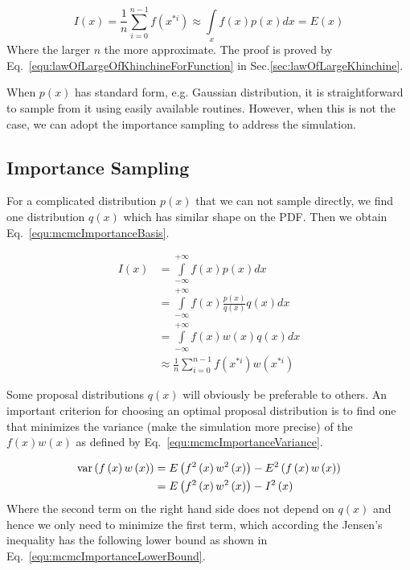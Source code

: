 \documentclass[runningheads,openany]{xhlPaper}
\begin{document}
\begin{equation}
\label{equ:mcmcPrincipleMC}
I\left( x \right) = \frac{1}{n}\sum\limits_{i = 0}^{n - 1} {f\left( {{x^{*i}}} \right)}  \approx \int\limits_x {f\left( x \right)p\left( x \right)dx}  = E\left( x \right)
\end{equation}
Where the larger $n$ the more approximate. The proof is proved by Eq.~\ref{equ:lawOfLargeOfKhinchineForFunction} in Sec.\ref{sec:lawOfLargeKhinchine}.

When $p\left(x\right)$ has standard form, e.g. Gaussian distribution, it is straightforward to sample from it using easily available routines. However, when this is not the case, we can adopt the importance sampling to address the simulation.

\subsection{Importance Sampling}
For a complicated distribution $p\left(x\right)$ that we can not sample directly, we find one distribution $q\left(x\right)$ which has similar shape on the PDF. Then we obtain Eq.~\ref{equ:mcmcImportanceBasis}.

\begin{equation}
\label{equ:mcmcImportanceBasis}
\begin{aligned}
I\left( x \right) &= \int\limits_{ - \infty }^{ + \infty } {f\left( x \right)p\left( x \right)dx} \\
 &= \int\limits_{ - \infty }^{ + \infty } {f\left( x \right)\frac{{p\left( x \right)}}{{q\left( x \right)}}q\left( x \right)} dx\\
 &= \int\limits_{ - \infty }^{ + \infty } {f\left( x \right)w\left( x \right)q\left( x \right)} dx\\
 &\approx \frac{1}{n}\sum\limits_{i = 0}^{n - 1} {f\left( {{x^{*i}}} \right)w\left( {{x^{*i}}} \right)} 
\end{aligned}
\end{equation}

Some proposal distributions $q\left(x\right)$ will obviously be preferable to others. An important criterion for choosing an optimal proposal distribution is to find one that minimizes the variance (make the simulation more precise) of the $f\left(x\right)w\left(x\right)$ as defined by Eq.~\ref{equ:mcmcImportanceVariance}.

\begin{equation}
\label{equ:mcmcImportanceVariance}
\begin{aligned}
{\mathop{\rm var}} \left( {f\left( x \right)w\left( x \right)} \right) &= E\left( {{f^2}\left( x \right){w^2}\left( x \right)} \right) - {E^2}\left( {f\left( x \right)w\left( x \right)} \right)\\
 &= E\left( {{f^2}\left( x \right){w^2}\left( x \right)} \right) - {I^2}\left( x \right)
\end{aligned}
\end{equation}
Where the second term on the right hand side does not depend on $q\left(x\right)$ and hence we only need to minimize the first term, which according the Jensen's inequality has the following lower bound as shown in Eq.~\ref{equ:mcmcImportanceLowerBound}.
\end{document}
